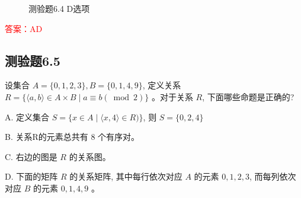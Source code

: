 \documentclass[UTF8, heading=true]{ctexart}
\begin{document}
\begin{figure}[H]
\begin{minipage}[t]{0.3\textwidth}
	      \vspace{-0.5cm}
        \caption{测验题6.4 D选项}
\end{minipage}
\end{figure}

\textcolor{red}{答案：AD}

\subsection{测验题6.5}

设集合 $A=\{0,1,2,3\}, B=\{0,1,4,9\}$, 定义关系 $R=\{\langle a, b\rangle \in A \times B \mid a \equiv b(\bmod 2)\}$ 。对于关系 $R$, 下面哪些命题是正确的?

A. 定义集合 $S=\{x \in A \mid\langle x, 4\rangle \in R)\}$, 则 $S=\{0,2,4\}$

B. 关系R的元素总共有 8 个有序对。

C. 右边的图是 $R$ 的关系图。

D. 下面的矩阵 $R$ 的关系矩阵, 其中每行依次对应 $A$ 的元素 $0,1,2,3$, 而每列依次对应 $B$ 的元素 $0,1,4,9$ 。
\end{document}
